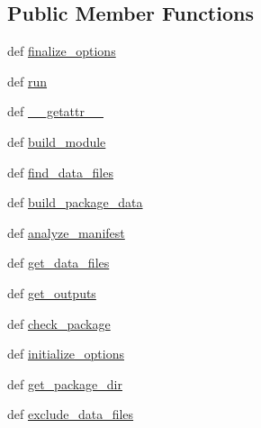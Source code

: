 \subsection*{Public Member Functions}
\begin{DoxyCompactItemize}
\item 
def \hyperlink{classsetuptools_1_1command_1_1build__py_1_1build__py_a112b42dde59c2b0e9f1fe10707cbbc8b}{finalize\+\_\+options}
\item 
def \hyperlink{classsetuptools_1_1command_1_1build__py_1_1build__py_ae39dbc7644921ece010a256eb2939806}{run}
\item 
def \hyperlink{classsetuptools_1_1command_1_1build__py_1_1build__py_aa9ce4106c069881085058ff8b2c9efdc}{\+\_\+\+\_\+getattr\+\_\+\+\_\+}
\item 
def \hyperlink{classsetuptools_1_1command_1_1build__py_1_1build__py_aac12b86e7814477e66731cda1a68f7fc}{build\+\_\+module}
\item 
def \hyperlink{classsetuptools_1_1command_1_1build__py_1_1build__py_adf8e40c80f3a048037ab38a6db8956dc}{find\+\_\+data\+\_\+files}
\item 
def \hyperlink{classsetuptools_1_1command_1_1build__py_1_1build__py_a2a68993d8e276a61b56391d559f71f23}{build\+\_\+package\+\_\+data}
\item 
def \hyperlink{classsetuptools_1_1command_1_1build__py_1_1build__py_ab7ca8edd4e16d192d08720c6ef1f6abe}{analyze\+\_\+manifest}
\item 
def \hyperlink{classsetuptools_1_1command_1_1build__py_1_1build__py_a7581de1f657bada84d182298a402b240}{get\+\_\+data\+\_\+files}
\item 
def \hyperlink{classsetuptools_1_1command_1_1build__py_1_1build__py_abbd2aa6dcc896ed68561b96d73d21fd6}{get\+\_\+outputs}
\item 
def \hyperlink{classsetuptools_1_1command_1_1build__py_1_1build__py_afa6933f208764e4217833072874e2db0}{check\+\_\+package}
\item 
def \hyperlink{classsetuptools_1_1command_1_1build__py_1_1build__py_a70967a037beebb84cacc77f8b02c87a6}{initialize\+\_\+options}
\item 
def \hyperlink{classsetuptools_1_1command_1_1build__py_1_1build__py_ae080695b7eee9078214e98da2d12ae88}{get\+\_\+package\+\_\+dir}
\item 
def \hyperlink{classsetuptools_1_1command_1_1build__py_1_1build__py_a5e1e1c8709c562f844328e3c920df5f4}{exclude\+\_\+data\+\_\+files}
\end{DoxyCompactItemize}
